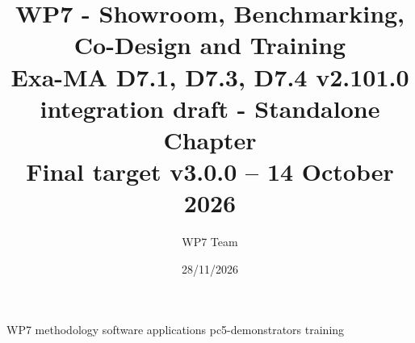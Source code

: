 \documentclass[11pt]{report}
\begin{document}
\title{WP7 - Showroom, Benchmarking, Co-Design and Training\\
\large Exa-MA D7.1, D7.3, D7.4 v2.101.0 integration draft - Standalone Chapter\\
\normalsize Final target v3.0.0 -- 14 October 2026}
\author{WP7 Team}
\date{28/11/2026}
\maketitle

\tableofcontents
\clearpage

{WP7}
{methodology}
{software}
{applications}
{pc5-demonstrators}
{training}
\clearpage


\end{document}
